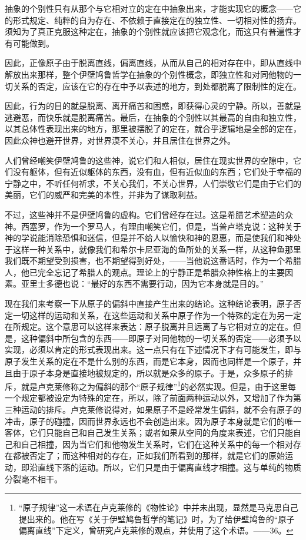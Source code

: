 \documentclass[a4paper,twoside,12pt,AutoFakeBold]{ctexart}
\begin{document}
抽象的个别性只有从那个与它相对立的定在中抽象出来，才能实现它的概念——它的形式规定、纯粹的自为存在、不依赖于直接定在的独立性、一切相对性的扬弃。须知为了真正克服这种定在，抽象的个别性就应该把它观念化，而这只有普遍性才有可能做到。

因此，正像原子由于脱离直线，偏离直线，从而从自己的相对存在中，即从直线中解放出来那样，整个伊壁鸠鲁哲学在抽象的个别性概念，即独立性和对同他物的一切关系的否定，应该在它的存在中予以表述的地方，到处都脱离了限制性的定在。

因此，行为的目的就是脱离、离开痛苦和困惑，即获得心灵的宁静。所以，善就是逃避恶，而快乐就是脱离痛苦。最后，在抽象的个别性以其最高的自由和独立性，以其总体性表现出来的地方，那里被摆脱了的定在，就合乎逻辑地是全部的定在，因此众神也避开世界，对世界漠不关心，并且居住在世界之外。

人们曾经嘲笑伊壁鸠鲁的这些神，说它们和人相似，居住在现实世界的空隙中，它们没有躯体，但有近似躯体的东西，没有血，但有近似血的东西；它们处于幸福的宁静之中，不听任何祈求，不关心我们，不关心世界，人们崇敬它们是由于它们的美丽，它们的威严和完美的本性，并非为了谋取利益。

不过，这些神并不是伊壁鸠鲁的虚构。它们曾经存在过。这是希腊艺术塑造的众神。西塞罗，作为一个罗马人，有理由嘲笑它们，但是，当普卢塔克说：这种关于神的学说能消除恐惧和迷信，但是并不给人以愉快和神的恩惠，而是使我们和神处于这样一种关系中，就像我们和希尔卡尼亚海的鱼所处的关系一样，从这种鱼那里我们既不期望受到损害，也不期望得到好处，——当他说这番话时，作为一个希腊人，他已完全忘记了希腊人的观点。理论上的宁静正是希腊众神性格上的主要因素。亚里士多德也说：“最好的东西不需要行动，因为它本身就是目的。”

现在我们来考察一下从原子的偏斜中直接产生出来的结论。这种结论表明，原子否定一切这样的运动和关系，在这些运动和关系中原子作为一个特殊的定在为另一定在所规定。这个意思可以这样来表达：原子脱离并且远离了与它相对立的定在。但是，这种偏斜中所包含的东西——即原子对同他物的一切关系的否定——必须予以实现，必须以肯定的形式表现出来。这一点只有在下述情况下才有可能发生，即与原子发生关系的定在不是什么别的东西，而是它本身，因而也同样是一个原子，并且由于原子本身是直接地被规定的，所以就是众多的原子。于是，众多原子的排斥，就是卢克莱修称之为偏斜的那个“原子规律”\footnote{“原子规律”这一术语在卢克莱修的《物性论》中并未出现，显然是马克思自己提出来的。他在写《关于伊壁鸠鲁哲学的笔记》时，为了给伊壁鸠鲁的“原子偏离直线”下定义，曾研究卢克莱修的观点，并使用了这个术语。——36。}的必然实现。但是，由于这里每一个规定都被设定为特殊的定在，所以，除了前面两种运动以外，又增加了作为第三种运动的排斥。卢克莱修说得对，如果原子不是经常发生偏斜，就不会有原子的冲击，原子的碰撞，因而世界永远也不会创造出来。因为原子本身就是它们的唯一客体，它们只能自己和自己发生关系；或者如果从空间的角度来表述，它们只能自己和自己相撞，因为当它们和他物发生关系时，它们在这种关系中的每一个相对存在都被否定了；而这种相对的存在，正如我们所看到的那样，就是它们的原始运动，即沿直线下落的运动。所以，它们只是由于偏离直线才相撞。这与单纯的物质分裂毫不相干。
\end{document}
